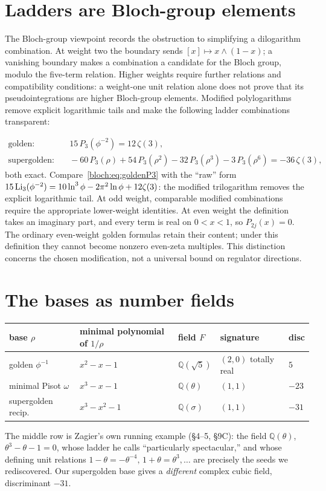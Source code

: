 \section{Ladders are Bloch-group elements}
The Bloch-group viewpoint records the obstruction to simplifying a
dilogarithm combination. At weight two the boundary sends
$[x]\mapsto x\wedge(1-x)$; a vanishing boundary makes a combination a
candidate for the Bloch group, modulo the five-term relation. Higher weights
require further relations and compatibility conditions: a weight-one unit
relation alone does not prove that its pseudointegrations are higher
Bloch-group elements. Modified polylogarithms remove explicit logarithmic
tails and make the following ladder combinations transparent:

\begin{align}
  \text{golden}:&\quad 15\,P_3(\phi^{-2})=12\,\zeta(3),\label{bloch:eq:goldenP3}\\
  \text{supergolden}:&\quad -60\,P_3(\rho)+54\,P_3(\rho^2)-32\,P_3(\rho^3)-3\,P_3(\rho^6)=-36\,\zeta(3),
  \label{bloch:eq:sgP3}
\end{align}
both exact. Compare~\eqref{bloch:eq:goldenP3} with the ``raw'' form $15\operatorname{Li}_3(\phi^{-2})=10\ln^3\phi-2\pi^2\ln\phi+12\zeta(3)$:
the modified trilogarithm removes the explicit logarithmic tail.
At odd weight, comparable modified combinations require the appropriate
lower-weight identities. At even weight the definition takes an imaginary
part, and every term is real on $0<x<1$, so $P_{2j}(x)=0$. The ordinary
even-weight golden formulas retain their content; under this definition
they cannot become nonzero even-zeta multiples. This distinction concerns
the chosen modification, not a universal bound on regulator directions.

\section{The bases as number fields}
\begin{center}\small
\begin{tabular}{lllll}
\toprule
base $\rho$ & minimal polynomial of $1/\rho$ & field $F$ & signature & disc \\
\midrule
golden $\phi^{-1}$ & $x^2-x-1$ & $\mathbb Q(\sqrt5)$ & $(2,0)$ totally real & $5$ \\
minimal Pisot $\omega$ & $x^3-x-1$ & $\mathbb Q(\theta)$ & $(1,1)$ & $-23$ \\
supergolden recip.\ & $x^3-x^2-1$ & $\mathbb Q(\sigma)$ & $(1,1)$ & $-31$ \\
\bottomrule
\end{tabular}
\end{center}
The middle row is Zagier's own running example (\S4--5, \S9C): the field $\mathbb Q(\theta)$, $\theta^3-\theta-1=0$,
whose ladder he calls ``particularly spectacular,'' and whose defining unit relations
$1-\theta=-\theta^{-4},\,1+\theta=\theta^3,\dots$ are precisely the seeds we rediscovered. Our supergolden base
gives a \emph{different} complex cubic field, discriminant $-31$.

